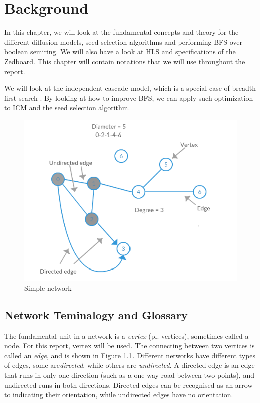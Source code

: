 \chapter{Background} \label{background}

In this chapter, we will look at the fundamental concepts and theory for the different diffusion models, seed selection algorithms and performing BFS over boolean semiring. We will also have a look at HLS and specifications of the Zedboard. This chapter will contain notations that we will use throughout the report.

 We will look at the independent cascade model, which is a special case of breadth first search  \cite{HybridBFS2015}. By looking at how to improve BFS, we can apply such optimization to ICM and the seed selection algorithm.
 \\

\begin{figure}[!ht]
	\includegraphics[scale=0.7]{Figures/smallExampleNetwork2}
	\caption{Simple network} 
	\label{fig:SimpleGraph}
\end{figure}

\section{Network Teminalogy and Glossary}
The fundamental unit in a network is a \textit{vertex} (pl. vertices), sometimes called a node. For this report, vertex will be used. The connecting between two vertices is called an \textit{edge}, and is shown in Figure \ref{fig:SimpleGraph}. Different networks have different types of edges, some are\textit{directed}, while others are \textit{undirected}. A directed edge is an edge that runs in only one direction (such as a one-way road between two points), and undirected runs in both directions. Directed edges can be recognised as an arrow to indicating their orientation, while undirected edges have no orientation. 

